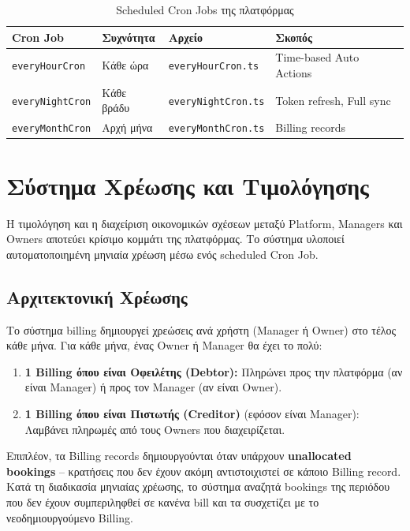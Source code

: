 \documentclass[
	12pt, %
	oneside, %
	greek,
	onehalfspacing, %
	liststotoc, %
	toctotoc, %
	parskip, %
	headsepline, %
]{MastersDoctoralThesis} %
\newcommand{\code}[1]{\texttt{#1}}
\begin{document}
\begin{table}[H]
\centering
\caption{Scheduled Cron Jobs της πλατφόρμας}
\label{tab:cron-jobs}
\begin{tabular}{@{}llll@{}}
\toprule
\textbf{Cron Job} & \textbf{Συχνότητα} & \textbf{Αρχείο} & \textbf{Σκοπός} \\
\midrule
\code{everyHourCron} & Κάθε ώρα & \code{everyHourCron.ts} & Time-based Auto Actions \\
\code{everyNightCron} & Κάθε βράδυ & \code{everyNightCron.ts} & Token refresh, Full sync \\
\code{everyMonthCron} & Αρχή μήνα & \code{everyMonthCron.ts} & Billing records \\
\bottomrule
\end{tabular}
\end{table}

\section{Σύστημα Χρέωσης και Τιμολόγησης}
\label{sec:billing-system}

Η τιμολόγηση και η διαχείριση οικονομικών σχέσεων μεταξύ Platform, Managers και Owners αποτεύει κρίσιμο κομμάτι της πλατφόρμας. Το σύστημα υλοποιεί αυτοματοποιημένη μηνιαία χρέωση μέσω ενός scheduled Cron Job.

\subsection{Αρχιτεκτονική Χρέωσης}
\label{subsec:billing-architecture}

Το σύστημα billing δημιουργεί χρεώσεις ανά χρήστη (Manager ή Owner) στο τέλος κάθε μήνα. Για κάθε μήνα, ένας Owner ή Manager θα έχει το πολύ:

\begin{enumerate}
    \item \textbf{1 Billing όπου είναι Οφειλέτης (Debtor):} Πληρώνει προς την πλατφόρμα (αν είναι Manager) ή προς τον Manager (αν είναι Owner).
    \item \textbf{1 Billing όπου είναι Πιστωτής (Creditor)} (εφόσον είναι Manager): Λαμβάνει πληρωμές από τους Owners που διαχειρίζεται.
\end{enumerate}

Επιπλέον, τα Billing records δημιουργούνται όταν υπάρχουν \textbf{unallocated bookings} -- κρατήσεις που δεν έχουν ακόμη αντιστοιχιστεί σε κάποιο Billing record. Κατά τη διαδικασία μηνιαίας χρέωσης, το σύστημα αναζητά bookings της περιόδου που δεν έχουν συμπεριληφθεί σε κανένα bill και τα συσχετίζει με το νεοδημιουργούμενο Billing.
\end{document}
